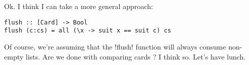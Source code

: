 \hspace*{\fill}
\lhA \failure Ok. I think I can take a more general approach:
\begin{lstlisting}[frame=single]
flush :: [Card] -> Bool
flush (c:cs) = all (\x -> suit x == suit c) cs
\end{lstlisting}
\success Of course, we're assuming that the \il!flush! function will always consume non-empty lists. 
\lhN Are we done with comparing cards ?
\lhA I think so. Let's have lunch.
\lhend
